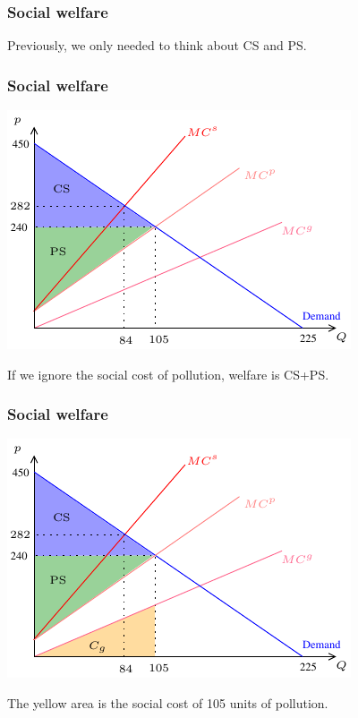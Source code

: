 \documentclass[xcolor=pdftex,dvipsnames]{beamer}
\begin{document}
\begin{frame}
  \frametitle{Social welfare}
  Previously, we only needed to think about CS and PS.
\bigskip

\bigskip


\end{frame}


\begin{frame}
  \frametitle{Social welfare}
  \begin{center}
    \includegraphics{pics/Ext3}
  \end{center}
If we ignore the social cost of pollution, welfare is CS+PS.
\end{frame}

\begin{frame}
  \frametitle{Social welfare}
  \begin{center}
    \includegraphics{pics/Ext4}
  \end{center}
The yellow area is the social cost of 105 units of pollution.
\end{frame}
\end{document}
